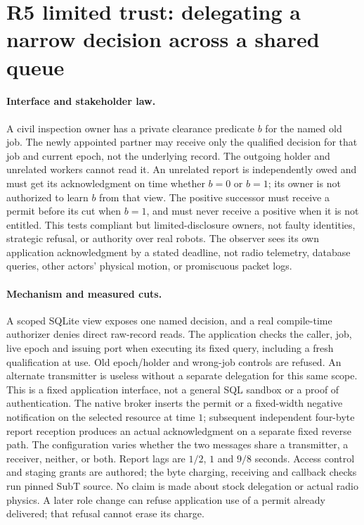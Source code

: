 \documentclass{article}
\begin{document}
\section*{R5 limited trust: delegating a narrow decision across a shared queue}
\paragraph{Interface and stakeholder law.}
A civil inspection owner has a private clearance predicate \(b\) for the
named old job. The newly appointed partner may receive only the
qualified decision for that job and current epoch, not the underlying
record. The outgoing holder and unrelated workers cannot read it.
An unrelated report is independently owed and must get its
acknowledgment on time whether \(b=0\) or \(b=1\); its owner is not
authorized to learn \(b\) from that view. The positive successor must
receive a permit before its cut when \(b=1\), and must never receive
a positive when it is not entitled. This tests compliant but
limited-disclosure owners, not faulty identities, strategic refusal,
or authority over real robots. The observer sees its own application
acknowledgment by a stated deadline, not radio telemetry, database
queries, other actors' physical motion, or promiscuous packet logs.

\paragraph{Mechanism and measured cuts.}
A scoped SQLite view exposes one named decision, and a real
compile-time authorizer denies direct raw-record reads. The
application checks the caller, job, live epoch and issuing port
when executing its fixed query, including a fresh qualification at use. Old epoch/holder and wrong-job
controls are refused. An alternate transmitter is useless without
a separate delegation for this same scope. This is a fixed
application interface, not a general SQL sandbox or a proof of
authentication. The native broker inserts the permit or a
fixed-width negative notification on the selected resource at time
\(1\); subsequent independent four-byte report reception produces
an actual acknowledgment on a separate fixed reverse path.
The configuration varies whether the two messages share a
transmitter, a receiver, neither, or both. Report lags are \(1/2\),
\(1\) and \(9/8\) seconds. Access control and staging grants are
authored; the byte charging, receiving and callback checks run
pinned SubT source. No claim is made about stock delegation or
actual radio physics. A later role change can refuse application use
of a permit already delivered; that refusal cannot erase its charge.
\end{document}
